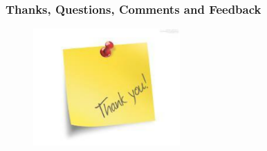 \documentclass[first=orange,second=purple,logo=redexc]{aaltoslides}
\begin{document}


\begin{frame}
 \frametitle{Thanks, Questions, Comments and Feedback}
 \begin{figure}[h!]
 \centering
 \includegraphics[width=0.5\textwidth]{figures/thanks}
 \end{figure}
 
 \end{frame}
 
\end{document}
